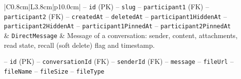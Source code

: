 \begin{center}
\begin{longtable}{|C{0.8cm}|L{3.8cm}|p{10.0cm}|}
\hspace*{1em}-- \texttt{id} (PK) \newline
\hspace*{1em}-- \texttt{slug} \newline
\hspace*{1em}-- \texttt{participant1} (FK) \newline
\hspace*{1em}-- \texttt{participant2} (FK) \newline
\hspace*{1em}-- \texttt{created\allowbreak At} \newline
\hspace*{1em}-- \texttt{deleted\allowbreak At} \newline
\hspace*{1em}-- \texttt{participant1\allowbreak Hidden\allowbreak At} \newline
\hspace*{1em}-- \texttt{participant2\allowbreak Hidden\allowbreak At} \newline
\hspace*{1em}-- \texttt{participant1\allowbreak Pinned\allowbreak At} \newline
\hspace*{1em}-- \texttt{participant2\allowbreak Pinned\allowbreak At} \\
 & \texttt{Direct\allowbreak Message} & Message of a conversation: sender, content, attachments, read state, recall (soft delete) flag and timestamp.\par\smallskip
\hspace*{1em}-- \texttt{id} (PK) \newline
\hspace*{1em}-- \texttt{conversation\allowbreak Id} (FK) \newline
\hspace*{1em}-- \texttt{sender\allowbreak Id} (FK) \newline
\hspace*{1em}-- \texttt{message} \newline
\hspace*{1em}-- \texttt{file\allowbreak Url} \newline
\hspace*{1em}-- \texttt{file\allowbreak Name} \newline
\hspace*{1em}-- \texttt{file\allowbreak Size} \newline
\hspace*{1em}-- \texttt{file\allowbreak Type} \newline

\end{longtable}
\end{center}
